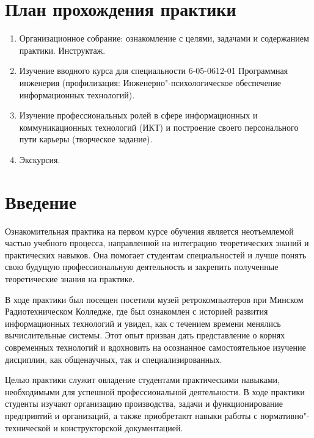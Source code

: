 \documentclass[variant=practice]{bsuir}
\begin{document}
\maketitle

\chapter*{План прохождения практики}

\begin{enumerate}
      \item Организационное собрание: ознакомление с целями, задачами и
            содержанием практики. Инструктаж.
      \item Изучение вводного курса  для
            специальности 6-05-0612-01 Программная инженерия (профилизация:
            Инженерно"-психологическое обеспечение информационных технологий).
      \item Изучение профессиональных ролей в сфере информационных и
            коммуникационных технологий (ИКТ) и построение своего персонального
            пути карьеры (творческое задание).
      \item Экскурсия.
\end{enumerate}

\maketoc*

\chapter*{Введение}


Ознакомительная практика на первом курсе обучения является неотъемлемой частью
учебного процесса, направленной на интеграцию теоретических знаний и
практических навыков. Она помогает студентам специальностей
 и  лучше понять свою будущую профессиональную деятельность и закрепить
полученные теоретические знания на практике.

В ходе практики был посещен посетили музей ретрокомпьютеров
\textit{} при Минском Радиотехническом Колледже, где был
ознакомлен с историей развития информационных технологий и увидел, как с
течением времени менялись вычислительные системы. Этот опыт призван дать
представление о корнях современных технологий и вдохновить на осознанное
самостоятельное изучение дисциплин, как общенаучных, так и специализированных.

Целью практики служит овладение студентами практическими навыками, необходимыми
для успешной профессиональной деятельности. В ходе практики студенты изучают
организацию производства, задачи и функционирование предприятий и организаций, а
также приобретают навыки работы с нормативно"-технической и конструкторской
документацией.
\end{document}
